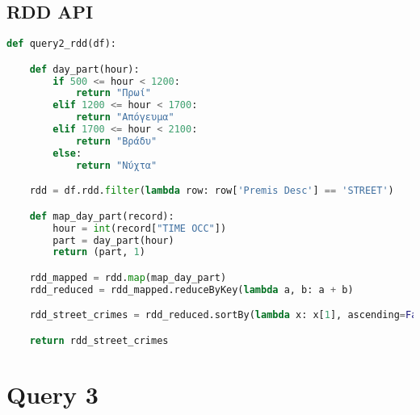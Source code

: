 \documentclass{article}
\begin{document}
\subsection*{RDD API}

\begin{lstlisting}[language = Python]
    def query2_rdd(df):

    def day_part(hour):
        if 500 <= hour < 1200:
            return "Πρωί"
        elif 1200 <= hour < 1700:
            return "Απόγευμα"
        elif 1700 <= hour < 2100:
            return "Βράδυ"
        else:
            return "Νύχτα"

    rdd = df.rdd.filter(lambda row: row['Premis Desc'] == 'STREET')

    def map_day_part(record):
        hour = int(record["TIME OCC"])
        part = day_part(hour)
        return (part, 1)

    rdd_mapped = rdd.map(map_day_part)
    rdd_reduced = rdd_mapped.reduceByKey(lambda a, b: a + b)

    rdd_street_crimes = rdd_reduced.sortBy(lambda x: x[1], ascending=False)

    return rdd_street_crimes 
\end{lstlisting}


\section*{Query 3}
\end{document}
